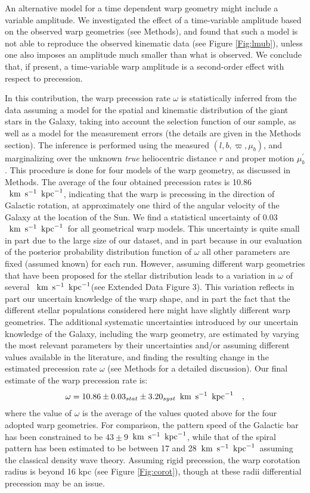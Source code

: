 \documentclass{nature}
\newcommand{\kmskpc}{$\text{\, km} \text{\, s}^{-1} \text{\, kpc}^{-1}$}
\begin{document}
An alternative model for a time dependent warp geometry might include a variable amplitude. We investigated the effect of a time-variable amplitude based on the observed warp geometries (see Methods), and found that such a model is not able
to reproduce the observed kinematic data (see Figure \ref{Fig:lmub}), unless one also imposes an amplitude much smaller than what is observed. We conclude that, if present, a time-variable warp amplitude is a second-order effect with respect to precession.

In this contribution, the warp precession rate $\omega$ is statistically inferred from the data assuming a model for the spatial and kinematic distribution of the giant stars in the Galaxy, taking into account the selection function of our sample, as well as a model for the measurement errors (the details are given in the Methods section). The inference is performed using the measured $(l,b,\varpi,\mu_b)$, and marginalizing over the unknown \emph{true} heliocentric distance $r$ and proper motion $\mu^\prime_{b}$. This procedure is done for four models of the warp geometry, as discussed in Methods. The average of the four obtained precession rates is 10.86 \kmskpc, indicating that the warp is precessing in the direction of Galactic rotation, at approximately one third of the angular velocity of the Galaxy at the location of the Sun. We find a statistical uncertainty of 0.03\kmskpc\ for all geometrical warp models. This uncertainty is quite small in part due to the large size of our dataset, and in part because in our evaluation of the posterior probability distribution function of $\omega$ all other parameters are fixed (assumed known) for each run. However, assuming different warp geometries that have been proposed for the stellar distribution leads to a variation in $\omega$ of several \kmskpc (see Extended Data Figure 3). This variation reflects in part our uncertain knowledge of the warp shape, and in part the fact that the different stellar populations considered here might have slightly different warp geometries\cite{Amores:2017}. The additional systematic uncertainties introduced by our uncertain knowledge of the Galaxy, including the warp geometry, are estimated by varying the most relevant parameters by their uncertainties and/or assuming different values available in the literature, and finding the resulting change in the estimated precession rate $\omega$ (see Methods for a detailed discussion). Our final estimate of the warp precession rate is:
\begin{equation}
\label{omega} 
\omega = 10.86 \pm 0.03_{stat} \pm 3.20_{syst} \text{\, km} \text{\, s}^{-1} \text{\, kpc}^{-1} \quad,
\end{equation}
where the value of $\omega$ is the average of the values quoted above for the four adopted warp geometries. For comparison, the pattern speed of the Galactic bar has been constrained to be $43 \pm 9$\kmskpc\cite{BlandGerhard:2016}, while that of the spiral pattern has been estimated to be between 17 and 28\kmskpc\ assuming the classical density wave theory\cite{Gerhard:2011}. Assuming rigid precession, the warp corotation radius is beyond 16 kpc (see Figure \ref{Fig:corot}), though at these radii differential precession may be an issue.  
\end{document}
